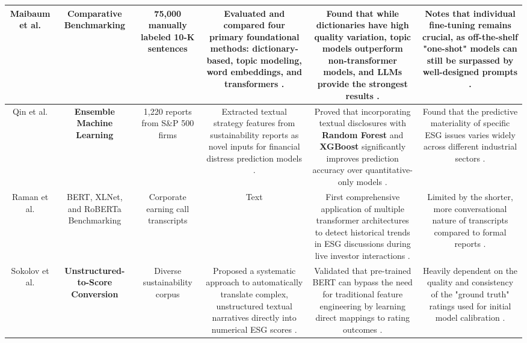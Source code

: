 \documentclass{article}
\begin{document}
\begin{table}[h!]
\begin{tabular}{|c|c|c|c|c|c|}
Maibaum et al.  \parencite{frederik_maibaum_b8629037} & \textbf{Comparative Benchmarking} & 75,000 manually labeled 10-K sentences  \parencite{frederik_maibaum_b8629037} & Evaluated and compared four primary foundational methods: dictionary-based, topic modeling, word embeddings, and transformers  \parencite{frederik_maibaum_b8629037}. & Found that while dictionaries have high quality variation, topic models outperform non-transformer models, and LLMs provide the strongest results  \parencite{frederik_maibaum_b8629037}. & Notes that individual fine-tuning remains crucial, as off-the-shelf "one-shot" models can still be surpassed by well-designed prompts  \parencite{frederik_maibaum_b8629037}. \\ \hline
Qin et al.  \parencite{songshan_qin_44a16493} & \textbf{Ensemble Machine Learning} & 1,220 reports from S\&P 500 firms  \parencite{songshan_qin_44a16493} & Extracted textual strategy features from sustainability reports as novel inputs for financial distress prediction models  \parencite{songshan_qin_44a16493}. & Proved that incorporating textual disclosures with \textbf{Random Forest} and \textbf{XGBoost} significantly improves prediction accuracy over quantitative-only models  \parencite{songshan_qin_44a16493}. & Found that the predictive materiality of specific ESG issues varies widely across different industrial sectors  \parencite{songshan_qin_44a16493}. \\ \hline
Raman et al.  \parencite{tristan_lim_a866987c} & BERT, XLNet, and RoBERTa Benchmarking & Corporate earning call transcripts  \parencite{tristan_lim_a866987c} & Text & First comprehensive application of multiple transformer architectures to detect historical trends in ESG discussions during live investor interactions  \parencite{tristan_lim_a866987c}. & Limited by the shorter, more conversational nature of transcripts compared to formal reports  \parencite{tristan_lim_a866987c}. \\ \hline
Sokolov et al.  \parencite{juyeon_kang_de009075} & \textbf{Unstructured-to-Score Conversion} & Diverse sustainability corpus  \parencite{juyeon_kang_de009075} & Proposed a systematic approach to automatically translate complex, unstructured textual narratives directly into numerical ESG scores  \parencite{juyeon_kang_de009075}. & Validated that pre-trained BERT can bypass the need for traditional feature engineering by learning direct mappings to rating outcomes  \parencite{juyeon_kang_de009075}. & Heavily dependent on the quality and consistency of the "ground truth" ratings used for initial model calibration  \parencite{juyeon_kang_de009075}. \\ \hline
\end{tabular}
\end{table}
\end{document}
